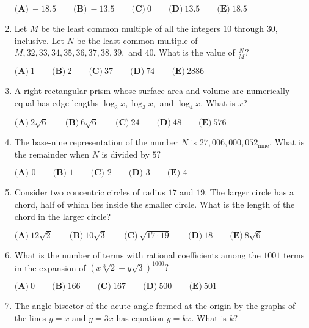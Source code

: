 \documentclass{article}
\begin{document}
\begin{enumerate}[label=\arabic*., itemsep=0.5em]
\(\textbf{(A)}\ {-}18.5  \qquad\textbf{(B)}\ {-}13.5 \qquad\textbf{(C)}\ 0 \qquad\textbf{(D)}\ 13.5 \qquad\textbf{(E)}\ 18.5\)\par \vspace{0.5em}\item Let \(M\) be the least common multiple of all the integers \(10\) through \(30,\) inclusive. Let \(N\) be the least common multiple of \(M,32,33,34,35,36,37,38,39,\) and \(40.\) What is the value of \(\frac{N}{M}?\)

\(\textbf{(A)}\ 1 \qquad\textbf{(B)}\ 2 \qquad\textbf{(C)}\ 37 \qquad\textbf{(D)}\ 74 \qquad\textbf{(E)}\ 2886\)\par \vspace{0.5em}\item A right rectangular prism whose surface area and volume are numerically equal has edge lengths \(\log_{2}x, \log_{3}x,\) and \(\log_{4}x.\) What is \(x?\)

\(\textbf{(A)}\ 2\sqrt{6} \qquad\textbf{(B)}\ 6\sqrt{6} \qquad\textbf{(C)}\ 24 \qquad\textbf{(D)}\ 48 \qquad\textbf{(E)}\ 576\)\par \vspace{0.5em}\item The base-nine representation of the number \(N\) is \(27{,}006{,}000{,}052_{\text{nine}}.\) What is the remainder when \(N\) is divided by \(5?\)

\(\textbf{(A) } 0\qquad\textbf{(B) } 1\qquad\textbf{(C) } 2\qquad\textbf{(D) } 3\qquad\textbf{(E) }4\)\par \vspace{0.5em}\item Consider two concentric circles of radius \(17\) and \(19.\) The larger circle has a chord, half of which lies inside the smaller circle. What is the length of the chord in the larger circle?

\(\textbf{(A)}\ 12\sqrt{2} \qquad\textbf{(B)}\ 10\sqrt{3} \qquad\textbf{(C)}\ \sqrt{17 \cdot 19} \qquad\textbf{(D)}\ 18 \qquad\textbf{(E)}\ 8\sqrt{6}\)\par \vspace{0.5em}\item What is the number of terms with rational coefficients among the \(1001\) terms in the expansion of \(\left(x\sqrt[3]{2}+y\sqrt{3}\right)^{1000}?\)

\(\textbf{(A)}\ 0 \qquad\textbf{(B)}\ 166 \qquad\textbf{(C)}\ 167 \qquad\textbf{(D)}\ 500 \qquad\textbf{(E)}\ 501\)\par \vspace{0.5em}\item The angle bisector of the acute angle formed at the origin by the graphs of the lines \(y = x\) and \(y=3x\) has equation \(y=kx.\) What is \(k?\)


\end{enumerate}
\end{document}
